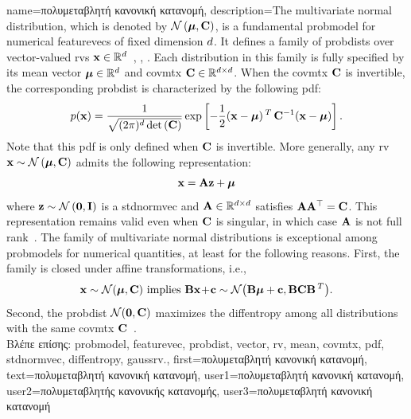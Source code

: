 {name={\foreignlanguage{greek}{πολυμεταβλητή κανονική κατανομή}}, 
	description={The multivariate normal distribution, 
		which is denoted by $\mathcal{N}\left({\bm \mu},{\bf C}\right)$, is a fundamental 
		\gls{probmodel} for numerical \gls{featurevec}s of fixed dimension $d$. 
		It defines a family of \gls{probdist}s over \gls{vector}-valued \gls{rv}s 
		${\bf x} \in \mathbb{R}^{d}$~\cite{BertsekasProb}, \cite{GrayProbBook}, \cite{Lapidoth09}. 
		Each distribution in this family is fully specified by its \gls{mean} \gls{vector} 
		${\bm \mu} \in \mathbb{R}^{d}$ and \gls{covmtx} 
		${\bf C} \in \mathbb{R}^{d \times d}$. When the 
		\gls{covmtx} ${\bf C}$ is invertible, the corresponding \gls{probdist} is 
		characterized by the following \gls{pdf}:
		\[p({\bf x}) = 
 		\frac{1}{\sqrt{(2\pi)^{d} \det\,({\bf C})}} 
 		\exp\left[ -\frac{1}{2} 
 		({\bf x} - {\bm \mu})\,^{T}\, {\bf C}^{-1} 
 		({\bf x} - {\bm \mu}) \right].
 		\]
		Note that this \gls{pdf} is only defined when ${\bf C}$ is invertible.
   		More generally, any \gls{rv} ${\bf x} \sim \mathcal{N}\left({\bm \mu},{\bf C}\right)$ 
   		admits the following representation:
  		\[
    		{\bf x} = {\bf A} {\bf z} + {\bm \mu}
   		\]
   		where ${\bf z} \sim \mathcal{N}\left(\mathbf{0},\mathbf{I}\right)$ is a \gls{stdnormvec} 
   		and ${\bf A} \in \mathbb{R}^{d \times d}$ satisfies ${\bf A} {\bf A}^\top = {\bf C}$. 
   		This representation remains valid even when ${\bf C}$ is singular, in which case ${\bf A}$ 
   		is not full rank~\cite[Ch. 23]{Lapidoth2017}.
   		The family of multivariate normal distributions is exceptional among \gls{probmodel}s for numerical 
   		quantities, at least for the following reasons. First, the family is closed under affine 
   		transformations, i.e.,
		\[ 
		{\bf x} \sim \mathcal{N}({\bm \mu},{\bf C}) \mbox{ implies } 
		{\bf B}{\bf x}\!+\!{\bf c} \sim \mathcal{N}\big( {\bf B}{\bm \mu}+{\bf c},{\bf B} {\bf C} {\bf B}\,^{T} \big). 
		\]
		Second, the \gls{probdist} $\mathcal{N}(\mathbf{0},{\bf C})$ maximizes the 
		\gls{diffentropy} among all distributions with the same \gls{covmtx} ${\bf C}$~\cite{coverthomas}. \\ 
		\foreignlanguage{greek}{Βλέπε επίσης:} \gls{probmodel}, \gls{featurevec}, \gls{probdist}, \gls{vector}, \gls{rv}, \gls{mean}, 
		\gls{covmtx}, \gls{pdf}, \gls{stdnormvec}, \gls{diffentropy}, \gls{gaussrv}.}, 
	first={\foreignlanguage{greek}{πολυμεταβλητή κανονική κατανομή}},
	text={\foreignlanguage{greek}{πολυμεταβλητή κανονική κατανομή}},
	user1={\foreignlanguage{greek}{πολυμεταβλητή κανονική κατανομή}}, %
	user2={\foreignlanguage{greek}{πολυμεταβλητής κανονικής κατανομής}}, %
	user3={\foreignlanguage{greek}{πολυμεταβλητή κανονική κατανομή}} %
}

